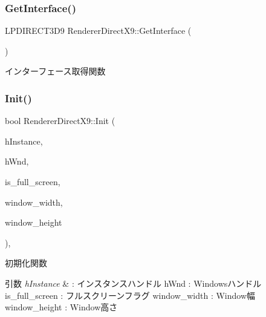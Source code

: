\mbox{\label{class_renderer_direct_x9_afa6521fe3ae4d5697687197cf5bf3c66}} 
\subsubsection{\texorpdfstring{Get\+Interface()}{GetInterface()}}
{\footnotesize\ttfamily L\+P\+D\+I\+R\+E\+C\+T3\+D9 Renderer\+Direct\+X9\+::\+Get\+Interface (\begin{DoxyParamCaption}{ }\end{DoxyParamCaption})}



インターフェース取得関数 

\mbox{\label{class_renderer_direct_x9_af015676b50f3ce1ba7cf20abf6074e3b}} 
\subsubsection{\texorpdfstring{Init()}{Init()}}
{\footnotesize\ttfamily bool Renderer\+Direct\+X9\+::\+Init (\begin{DoxyParamCaption}\item[{H\+I\+N\+S\+T\+A\+N\+CE}]{h\+Instance,  }\item[{H\+W\+ND}]{h\+Wnd,  }\item[{B\+O\+OL}]{is\+\_\+full\+\_\+screen,  }\item[{int}]{window\+\_\+width,  }\item[{int}]{window\+\_\+height }\end{DoxyParamCaption})\hspace{0.3cm}{\ttfamily [override]}, {\ttfamily [virtual]}}



初期化関数 


\begin{DoxyParams}{引数}
{\em h\+Instance} & \+: インスタンスハンドル h\+Wnd \+: Windowsハンドル is\+\_\+full\+\_\+screen \+: フルスクリーンフラグ window\+\_\+width \+: Window幅 window\+\_\+height \+: Window高さ \\
\hline
\end{DoxyParams}


